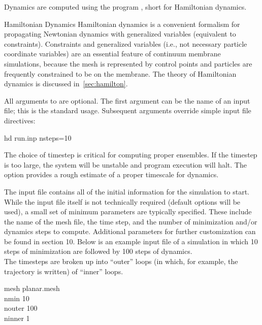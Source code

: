 

Dynamics are computed using the program , short for Hamiltonian dynamics. 

\begin{bcomment}{Hamiltonian Dynamics}
Hamiltonian dynamics is a convenient formalism for propagating Newtonian dynamics with generalized variables (equivalent to constraints). Constraints and generalized variables (i.e., not necessary particle coordinate variables) are an essential feature of continuum membrane simulations, because the mesh is represented by control points and particles are frequently constrained to be on the membrane. The theory of Hamiltonian dynamics is discussed in~\cref{sec:hamilton}. 
\end{bcomment}

All arguments to  are optional.
The first argument can be the name of an input file; this is the standard usage.
Subsequent arguments override simple input file directives:
\begin{command}
hd run.inp nsteps=10
\label{cmd:hd}
\end{command}



The choice of timestep is critical for computing proper ensembles. 
If the timestep is too large, the system will be unstable and program execution will halt.
The option  provides a rough estimate of a proper timescale for dynamics.

The input file contains all of the initial information for the simulation to start. 
While the input file itself is not technically required (default options will be used), a small set of minimum parameters are typically specified. 
These include the name of the mesh file, the time step, and the number of minimization and/or dynamics steps to compute.
Additional parameters for further customization can be found in section 10. 
Below is an example input file of a simulation in which 10 steps of minimization are followed by 100 steps of dynamics. \\ 
The timesteps are broken up into  ``outer'' loops (in which, for example, the trajectory is written) of  ``inner'' loops. 


\begin{icommand}
mesh	planar.mesh 	\\
nmin	10 		\\
nouter	100 		\\
ninner  1
\end{icommand}

